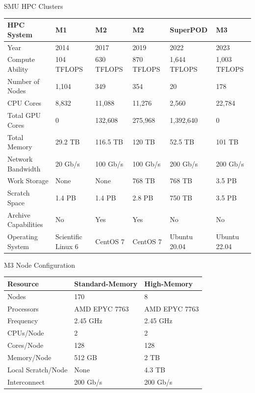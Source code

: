 \begin{frame}{SMU HPC Clusters}
\begin{table}
\scriptsize
\begin{tabular}{llllll}
\toprule
HPC System & M1 & M2 & M2 & SuperPOD & M3 \\
\midrule
Year & 2014 & 2017 & 2019 & 2022 & 2023 \\
Compute Ability & 104 TFLOPS & 630 TFLOPS & 870 TFLOPS & 1,644 TFLOPS &
1,003 TFLOPS \\
Number of Nodes & 1,104 & 349 & 354 & 20 & 178 \\
CPU Cores & 8,832 & 11,088 & 11,276 & 2,560 & 22,784 \\
Total GPU Cores & 0 & 132,608 & 275,968 & 1,392,640 & 0 \\
Total Memory & 29.2 TB & 116.5 TB & 120 TB & 52.5 TB & 101 TB \\
Network Bandwidth & 20 Gb/s & 100 Gb/s & 100 Gb/s & 200 Gb/s & 200
Gb/s \\
Work Storage & None & None & 768 TB & 768 TB & 3.5 PB \\
Scratch Space & 1.4 PB & 1.4 PB & 2.8 PB & 750 TB & 3.5 PB \\
Archive Capabilities & No & Yes & Yes & No & No \\
Operating System & Scientific Linux 6 & CentOS 7 & CentOS 7 & Ubuntu
20.04 & Ubuntu 22.04 \\
\bottomrule
\end{tabular}
\end{table}
\end{frame}

\begin{frame}{M3 Node Configuration}
\begin{table}
\begin{tabular}{lll}
\toprule
Resource & Standard-Memory & High-Memory \\
\midrule
Nodes & 170 & 8 \\
Processors & AMD EPYC 7763 & AMD EPYC 7763 \\
Frequency & 2.45 GHz & 2.45 GHz \\
CPUs/Node & 2 & 2 \\
Cores/Node & 128 & 128 \\
Memory/Node & 512 GB & 2 TB \\
Local Scratch/Node & None & 4.3 TB \\
Interconnect & 200 Gb/s & 200 Gb/s \\
\bottomrule
\end{tabular}
\end{table}
\end{frame}

